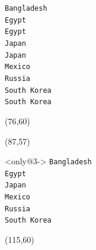 \documentclass{beamer}
\begin{document}
\begin{frame}[fragile,t]
\begin{textblock}{35}
\begin{block}
    \verb:Bangladesh:\\
    \verb:Egypt:\\
    \verb:Egypt:\\
    \verb:Japan:\\
    \verb:Japan:\\
    \verb:Mexico:\\
    \verb:Russia:\\
    \verb:South Korea:\\
    \verb:South Korea:\\
    \vspace*{0.5ex}
    \end{block}
    \end{textblock}
    \begin{textblock}{35}(76,60)
    \end{textblock}
    \begin{textblock}{35}(87,57)
    \begin{block}<only@3->{\vspace*{-3ex}}
    \scriptsize
    \verb:Bangladesh:\\
    \verb:Egypt:\\
    \verb:Japan:\\
    \verb:Mexico:\\
    \verb:Russia:\\
    \verb:South Korea:\\
    \vspace*{0.5ex}
    \end{block}
    \end{textblock}
    \begin{textblock}{35}(115,60)
    \end{textblock}
\end{frame}
\end{document}
